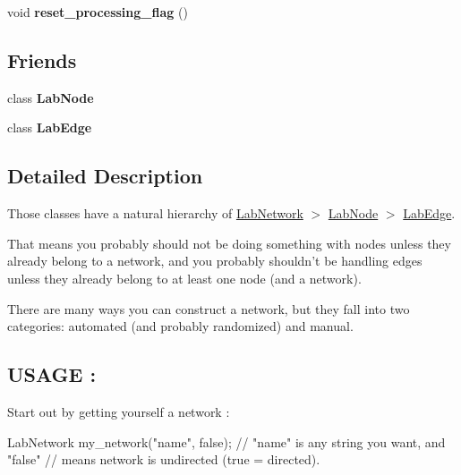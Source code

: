 \begin{DoxyCompactItemize}
\item 
\hypertarget{classelps_1_1_lab_network_aaa6dd02033b0838fea245852a7b2b5ae}{void {\bfseries reset\-\_\-processing\-\_\-flag} ()}\label{classelps_1_1_lab_network_aaa6dd02033b0838fea245852a7b2b5ae}

\end{DoxyCompactItemize}
\subsection*{Friends}
\begin{DoxyCompactItemize}
\item 
\hypertarget{classelps_1_1_lab_network_ac56a76b904b641106cb3d628fdfe41ea}{class {\bfseries Lab\-Node}}\label{classelps_1_1_lab_network_ac56a76b904b641106cb3d628fdfe41ea}

\item 
\hypertarget{classelps_1_1_lab_network_a046f6907a306a9e8f90bc4e7bb2a9a4b}{class {\bfseries Lab\-Edge}}\label{classelps_1_1_lab_network_a046f6907a306a9e8f90bc4e7bb2a9a4b}

\end{DoxyCompactItemize}


\subsection{Detailed Description}
Those classes have a natural hierarchy of \hyperlink{classelps_1_1_lab_network}{Lab\-Network} $>$ \hyperlink{classelps_1_1_lab_node}{Lab\-Node} $>$ \hyperlink{classelps_1_1_lab_edge}{Lab\-Edge}.\par
 That means you probably should not be doing something with nodes unless they already belong to a network, and you probably shouldn't be handling edges unless they already belong to at least one node (and a network).

There are many ways you can construct a network, but they fall into two categories\-: automated (and probably randomized) and manual.

\subsection*{U\-S\-A\-G\-E \-:}

Start out by getting yourself a network \-:


\begin{DoxyCode}
LabNetwork my\_network(\textcolor{stringliteral}{"name"}, \textcolor{keyword}{false});    \textcolor{comment}{// "name" is any string you want, and
       "false"}
                                         \textcolor{comment}{// means network is undirected (true =
       directed).}
\end{DoxyCode}


